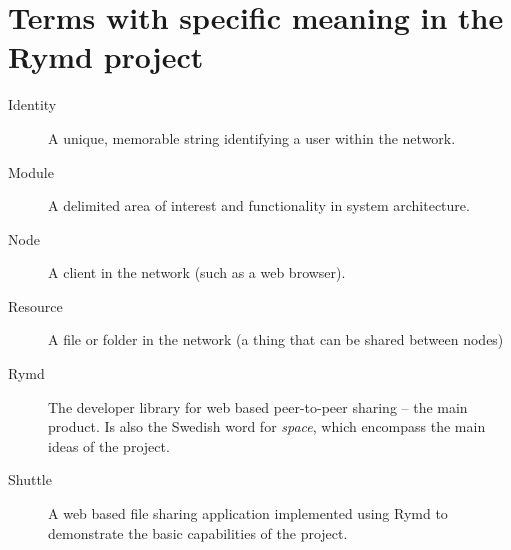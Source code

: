\section{Terms with specific meaning in the Rymd project}
\begin{description}
  \item[Identity] A unique, memorable string identifying a user within the network.
  \item[Module] A delimited area of interest and functionality in system architecture.
  \item[Node] A client in the network (such as a web browser).
  \item[Resource] A file or folder in the network (a thing that can be shared between nodes)
  \item[Rymd] The developer library for web based peer-to-peer sharing – the main product. Is also the Swedish word for \emph{space}, which encompass the main ideas of the project.
  \item[Shuttle] A web based file sharing application implemented using Rymd to demonstrate the basic capabilities of the project.
\end{description}
